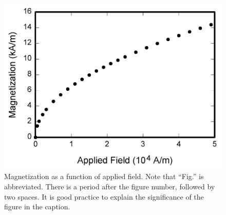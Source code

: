 \documentclass[journal]{IEEEtran}
\begin{document}
\begin{figure}
\centerline{\includegraphics[width=\columnwidth]{fig1.png}}
\caption{Magnetization as a function of applied field. Note that ``Fig.'' is abbreviated. There is a period after the figure number, followed by two spaces. It is good practice to explain the significance of the figure in the caption.}
\end{figure}
\end{document}
